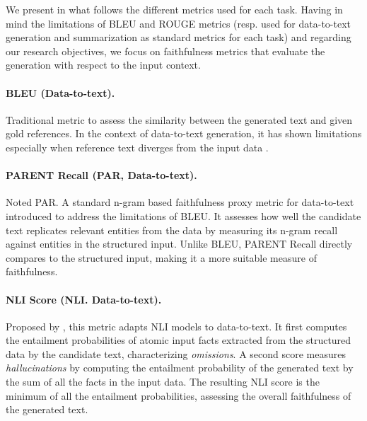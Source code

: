 
We present in what follows the different metrics used for each task. Having in mind the limitations of BLEU and ROUGE metrics (resp. used for data-to-text generation and summarization as standard metrics for each task) and regarding our research objectives, we focus on faithfulness metrics that evaluate the generation with respect to the input context. 


\paragraph{BLEU (Data-to-text).} Traditional metric to assess the similarity between the generated text and given gold references. In the context of data-to-text generation, it has shown limitations especially when reference text diverges from the input data \citep{parent}.


\paragraph{PARENT Recall (PAR, Data-to-text).} \citep{parent} Noted PAR. A standard n-gram based faithfulness proxy metric for data-to-text introduced to address the limitations of BLEU. It assesses how well the candidate text replicates relevant entities from the data by measuring its n-gram recall against entities in the structured input. Unlike BLEU, PARENT Recall directly compares to the structured input, making it a more suitable measure of faithfulness.

 
\paragraph{NLI Score (NLI. Data-to-text).} Proposed by \citet{nli-d2t}, this metric adapts NLI models to data-to-text. It first computes the entailment probabilities of atomic input facts extracted from the structured data by the candidate text, characterizing \textit{omissions}. A second score measures \textit{hallucinations} by computing the entailment probability of the generated text by the sum of all the facts in the input data. The resulting NLI score is the minimum of all the entailment probabilities, assessing the overall faithfulness of the generated text.




